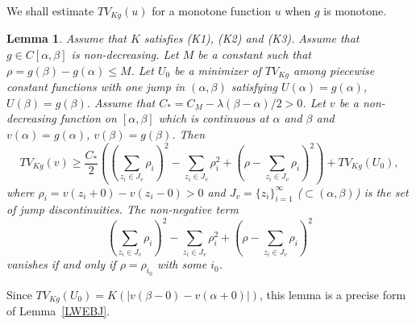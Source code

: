 \documentclass[12pt, reqno]{amsart}
\numberwithin{equation}{section}
\newtheorem{lemma}[thm]{Lemma}
\begin{document}
We shall estimate $TV_{Kg}(u)$ for a monotone function $u$ when $g$ is monotone.
%
\begin{lemma} \label{LEBJ}
Assume that $K$ satisfies (K1), (K2) and (K3).
 Assume that $g\in C[\alpha,\beta]$ is non-decreasing.
 Let $M$ be a constant such that $\rho=g(\beta)-g(\alpha)\leq M$.
 Let $U_0$ be a minimizer of $TV_{Kg}$ among piecewise constant functions with one jump in $(\alpha,\beta)$ satisfying $U(\alpha)=g(\alpha)$, $U(\beta)=g(\beta)$.
 Assume that $C_*=C_M-\lambda(\beta-\alpha)/2>0$.
 Let $v$ be a non-decreasing function on $[\alpha,\beta]$ which is continuous at $\alpha$ and $\beta$ and $v(\alpha)=g(\alpha)$, $v(\beta)=g(\beta)$.
 Then
\[
	TV_{Kg}(v) \geq \frac{C_*}{2} \left( \left(\sum_{z_i\in J_v} \rho_i \right)^2
	- \sum_{z_i\in J_v} \rho_i^2 + \left(\rho-\sum_{z_i\in J_v} \rho_i \right)^2 \right)
	+ TV_{Kg}(U_0),
\] 
where $\rho_i=v(z_i+0)-v(z_i-0)>0$ and $J_v=\{z_i\}_{i=1}^\infty$ ($\subset(\alpha,\beta)$) is the set of jump discontinuities.
 The non-negative term
\[
	\left( \sum_{z_i\in J_v} \rho_i \right)^2
	- \sum_{z_i\in J_v} \rho_i^2 + \left(\rho-\sum_{z_i\in J_v} \rho_i \right)^2
\]
vanishes if and only if $\rho=\rho_{i_0}$ with some $i_0$.
\end{lemma}

Since $TV_{Kg}(U_0)=K\left(\left|v(\beta-0)-v(\alpha+0)\right|\right)$, this lemma is a precise form of Lemma~\ref{LWEBJ}.
\end{document}

